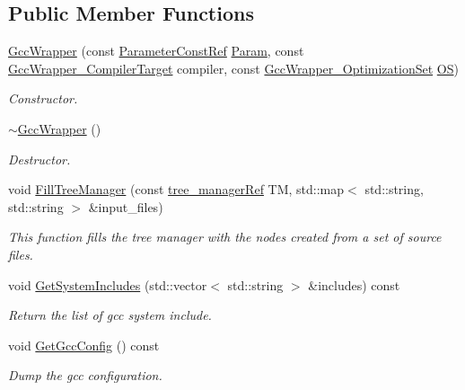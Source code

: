 \subsection*{Public Member Functions}
\begin{DoxyCompactItemize}
\item 
\hyperlink{classGccWrapper_a0d0fefb5b807d15af703e65b5c04be78}{Gcc\+Wrapper} (const \hyperlink{Parameter_8hpp_a37841774a6fcb479b597fdf8955eb4ea}{Parameter\+Const\+Ref} \hyperlink{classGccWrapper_ae052c2164d449f57b725ab2d2fc41779}{Param}, const \hyperlink{gcc__wrapper_8hpp_abb9d9a5cb3a1bf5d402dbc841a6708aa}{Gcc\+Wrapper\+\_\+\+Compiler\+Target} compiler, const \hyperlink{gcc__wrapper_8hpp_a0f57d29a8e8442ddf6d2cd8577c6788d}{Gcc\+Wrapper\+\_\+\+Optimization\+Set} \hyperlink{classGccWrapper_a5494d211289aec8f9b4231c860489c6a}{OS})
\begin{DoxyCompactList}\small\item\em Constructor. \end{DoxyCompactList}\item 
\hyperlink{classGccWrapper_ab7a6fb46dd178ce5cebe8f4d2f368c3f}{$\sim$\+Gcc\+Wrapper} ()
\begin{DoxyCompactList}\small\item\em Destructor. \end{DoxyCompactList}\item 
void \hyperlink{classGccWrapper_a6ddec058ff78ec89be3b4f7b65b7d669}{Fill\+Tree\+Manager} (const \hyperlink{tree__manager_8hpp_a96ff150c071ce11a9a7a1e40590f205e}{tree\+\_\+manager\+Ref} TM, std\+::map$<$ std\+::string, std\+::string $>$ \&input\+\_\+files)
\begin{DoxyCompactList}\small\item\em This function fills the tree manager with the nodes created from a set of source files. \end{DoxyCompactList}\item 
void \hyperlink{classGccWrapper_a61564c5b5c0731306ac6e722d1826522}{Get\+System\+Includes} (std\+::vector$<$ std\+::string $>$ \&includes) const
\begin{DoxyCompactList}\small\item\em Return the list of gcc system include. \end{DoxyCompactList}\item 
void \hyperlink{classGccWrapper_ab7fc5dafe65775ce866c205c60fd8413}{Get\+Gcc\+Config} () const
\begin{DoxyCompactList}\small\item\em Dump the gcc configuration. \end{DoxyCompactList}\item 

\end{DoxyCompactItemize}
